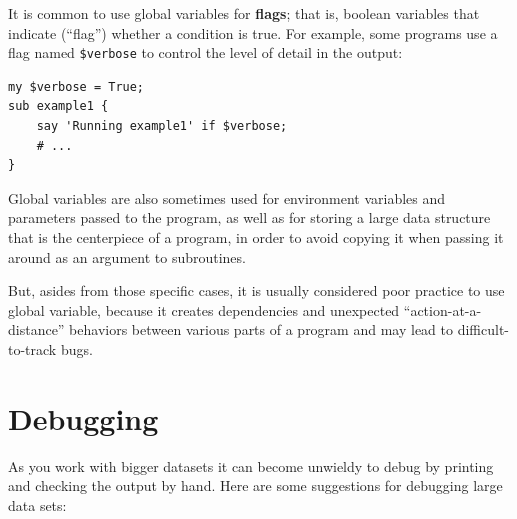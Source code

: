 It is common to use global variables for {\bf flags}; that is, 
boolean variables that indicate (``flag'') whether a condition
is true.  For example, some programs use a flag named 
\verb'$verbose' to control the level of detail in the
output:

\begin{verbatim}
my $verbose = True;
sub example1 {
    say 'Running example1' if $verbose;
    # ...
}
\end{verbatim}
%

Global variables are also sometimes used for environment 
variables and parameters passed to the program, as well
as for storing a large 
data structure that is the centerpiece of a program, in order 
to avoid copying it when passing it around as an argument to 
subroutines.

But, asides from those specific cases, it is usually 
considered poor practice to use global variable, because 
it creates dependencies and unexpected ``action-at-a-distance'' 
behaviors between various parts of a program and may lead to 
difficult-to-track bugs.


\section{Debugging}

As you work with bigger datasets it can become unwieldy to
debug by printing and checking the output by hand.  Here are some
suggestions for debugging large data sets:

